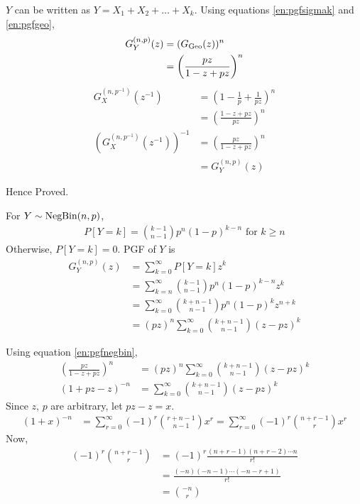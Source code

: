 \begin{solution}
	$Y$ can be written as $Y=X_1+X_2+\dots+X_k$. Using equations
	\ref{en:pgfsigmak} and \ref{en:pgfgeo},
	\begin{align}
		G_Y^{(n,p)}(z) & = (G_{\text{Geo}}(z))^n                    \\
		               & = \left(\frac{pz}{1-z+pz}\right)^n \\
		\label{en:pgfnegbin}
	\end{align}
	\begin{align}
		G_X^{(n,p^{-1})}(z^{-1})                   & =
		\left(1-\frac{1}{p} + \frac{1}{pz}\right)^n                   \\
		                                           & =
		\left(\frac{1-z+pz}{pz}\right)^n
		\\
		\left(G_X^{(n,p^{-1})}(z^{-1})\right)^{-1} & =
		\left(\frac{pz}{1-z+pz}\right)^n
		\\
		                                           & = G_Y^{(n,p)}(z)
	\end{align}

	Hence Proved.




	For $Y\sim\text{NegBin}(n,p)$,
	\begin{align}
		P[Y=k] = \binom{k-1}{n-1}p^n(1-p)^{k-n}
		\text{ for } k\geq n
	\end{align}
	Otherwise, $P[Y=k]=0$. PGF of $Y$ is
	\begin{align}
		G_Y^{(n,p)}(z) & = \sum_{k=0}^\infty P[Y=k]z^k                           \\
		               & = \sum_{k=n}^\infty \binom{k-1}{n-1}p^n(1-p)^{k-n}z^k   \\
		               & = \sum_{k=0}^\infty \binom{k+n-1}{n-1}p^n(1-p)^kz^{n+k} \\
		               & = (pz)^n\sum_{k=0}^\infty \binom{k+n-1}{n-1}(z-pz)^k
	\end{align}

	Using equation \ref{en:pgfnegbin},
	\begin{align}
		\left(\frac{pz}{1-z+pz}\right)^n & = (pz)^n\sum_{k=0}^\infty
		\binom{k+n-1}{n-1}(z-pz)^k                                   \\
		\left(1+pz-z\right)^{-n}         & = \sum_{k=0}^\infty
		\binom{k+n-1}{n-1}(z-pz)^k
	\end{align}
	Since $z$, $p$ are arbitrary, let $pz-z = x$.
	\begin{align}
		(1+x)^{-n} & = \sum_{r=0}^\infty (-1)^r\binom{r+n-1}{n-1}x^r =
		\sum_{r=0}^\infty (-1)^r\binom{n+r-1}{r}x^r
	\end{align}
	Now,
	\begin{align}
		(-1)^r\binom{n+r-1}{r} & = (-1)^r\frac{(n+r-1)(n+r-2)\cdots n}{r!} \\
		                       & = \frac{(-n)(-n-1)\cdots (-n-r+1)}{r!}    \\
		                       & = \binom{-n}{r}
	\end{align}


\end{solution}

